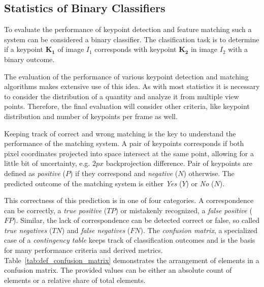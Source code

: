 \subsection{Statistics of Binary Classifiers}

To evaluate the performance of keypoint detection and feature matching such a system can be considered a binary classifier.
The clasification task is to determine if a keypoint $\mathbf{K_1}$ of image $I_1$ corresponds with keypoint $\mathbf{K_2}$ in image $I_2$ with a binary outcome.

The evaluation of the performance of various keypoint detection and matching algorithms makes extensive use of this idea.
As with most statistics it is necessary to consider the distribution of a quantity and analyze it from multiple view points.
Therefore, the final evaluation will consider other criteria, like keypoint distribution and number of keypoints per frame as well.

Keeping track of correct and wrong matching is the key to understand the performance of the matching system.
A pair of keypoints corresponds if both pixel coordinates projected into space intersect at the same point, allowing for a little bit of uncertainty, e.g. $2px$ backprojection difference.
Pair of keypoints are defined as \emph{positive} ($P$) if they correspond and \emph{negative} ($N$) otherwise.
The predicted outcome of the matching system is either \emph{Yes} ($Y$) or \emph{No} ($N$).

This correctness of this prediction is in one of four categories.
A correspondence can be correctly, a \emph{true positive} ($TP$) or mistakenly recognized, a \emph{false positive} ($FP$).
Similar, the lack of correspondence can be detected correct or false, so called \emph{true negatives} ($TN$) and \emph{false negatives} ($FN$).
The \emph{confusion matrix}, a specialized case of a \emph{contingency table}\cite{agresti_2007} keeps track of classification outcomes and is the basis for many performance criteria and derived metrics.
Table~\ref{tab:def_confusion_matrix} demonstrates the arrangement of elements in a confusion matrix.
The provided values can be either an absolute count of elements or a relative share of total elements.

